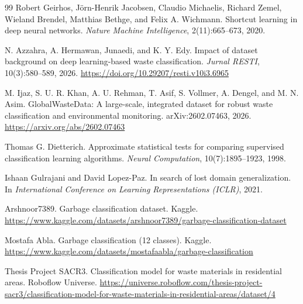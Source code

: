 \documentclass[11pt,a4paper]{article}
\begin{document}
\begin{thebibliography}{99}
		Robert Geirhos, Jörn-Henrik Jacobsen, Claudio Michaelis, Richard Zemel, Wieland Brendel, Matthias Bethge, and Felix A. Wichmann.
		Shortcut learning in deep neural networks.
		\textit{Nature Machine Intelligence}, 2(11):665--673, 2020.
		
		N. Azzahra, A. Hermawan, Junaedi, and K. Y. Edy.
		Impact of dataset background on deep learning-based waste classification.
		\textit{Jurnal RESTI}, 10(3):580--589, 2026.
		\url{https://doi.org/10.29207/resti.v10i3.6965}
		
		M. Ijaz, S. U. R. Khan, A. U. Rehman, T. Asif, S. Vollmer, A. Dengel, and M. N. Asim.
		GlobalWasteData: A large-scale, integrated dataset for robust waste classification and environmental monitoring.
		arXiv:2602.07463, 2026.
		\url{https://arxiv.org/abs/2602.07463}
		
		Thomas G. Dietterich.
		Approximate statistical tests for comparing supervised classification learning algorithms.
		\textit{Neural Computation}, 10(7):1895--1923, 1998.
		
		Ishaan Gulrajani and David Lopez-Paz.
		In search of lost domain generalization.
		In \textit{International Conference on Learning Representations (ICLR)}, 2021.
		
		Arshnoor7389.
		Garbage classification dataset.
		Kaggle. \url{https://www.kaggle.com/datasets/arshnoor7389/garbage-classification-dataset}
		
		Mostafa Abla.
		Garbage classification (12 classes).
		Kaggle. \url{https://www.kaggle.com/datasets/mostafaabla/garbage-classification}
		
		Thesis Project SACR3.
		Classification model for waste materials in residential areas.
		Roboflow Universe. \url{https://universe.roboflow.com/thesis-project-sacr3/classification-model-for-waste-materials-in-residential-areas/dataset/4}
		
	\end{thebibliography}
	
\end{document}
